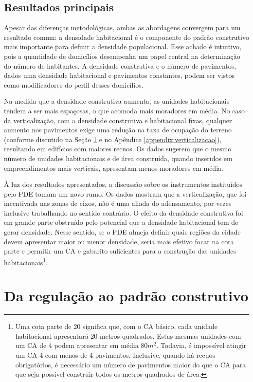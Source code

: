 \subsection{Resultados principais}

Apesar das diferenças metodológicas, ambas as abordagens convergem para um resultado comum: a densidade habitacional é o componente do padrão construtivo mais importante para definir a densidade populacional. Esse achado é intuitivo, pois a quantidade de domicílios desempenha um papel central na determinação do número de habitantes. A densidade construtiva e o número de pavimentos, dados uma densidade habitacional e pavimentos constantes, podem ser vistos como modificadores do perfil desses domicílios.

Na medida que a densidade construtiva aumenta, as unidades habitacionais tendem a ser mais espaçosas, o que acomoda mais moradores em média. No caso da verticalização, com a densidade construtiva e habitacional fixas, qualquer aumento nos pavimentos exige uma redução na taxa de ocupação do terreno (conforme discutido na Seção \ref{sec:perg2} e no Apêndice \ref{appendix:verticalizacao}), resultando em edifícios com maiores recuos. Os dados sugerem que o mesmo número de unidades habitacionais e de área construída, quando inseridos em empreendimentos mais verticais, apresentam menos moradores em média. 

À luz dos resultados apresentados, a discussão sobre os instrumentos instituídos pelo PDE tomam um novo rumo. Os dados mostram que a verticalização, que foi incentivada nas zonas de eixos, não é uma aliada do adensamento, por vezes inclusive trabalhando no sentido contrário. O efeito da densidade construtiva foi em grande parte obstruído pelo potencial que a densidade habitacional tem de gerar densidade. Nesse sentido, se o PDE almeja definir quais regiões da cidade devem apresentar maior ou menor densidade, seria mais efetivo focar na cota parte e permitir um CA e gabarito suficientes para a construção das unidades habitacionais\footnote{Uma cota parte de 20 significa que, com o CA básico, cada unidade habitacional apresentará 20 metros quadrados. Estas mesmas unidades com um CA de 4 podem apresentar em média 80$m^2$. Todavia, é impossível atingir um CA 4 com menos de 4 pavimentos. Inclusive, quando há recuos obrigatórios, é necessário um número de pavimentos maior do que o CA para que seja possível construir todos os metros quadrados de área.}.  

\clearpage
\section{Da regulação ao padrão construtivo}
\label{sec:perg2}

